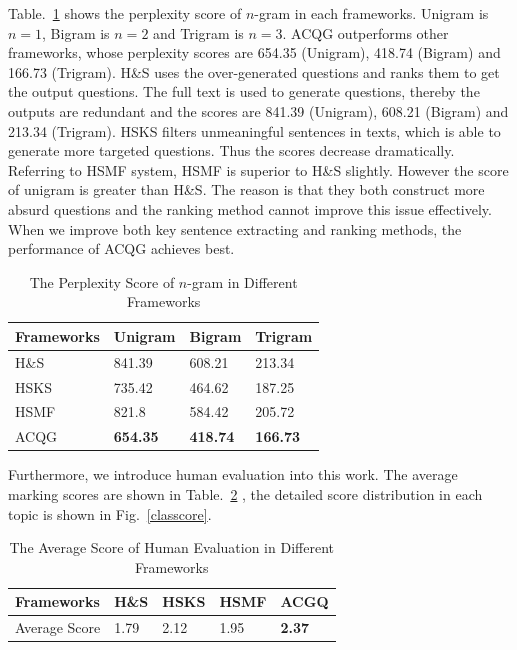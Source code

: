 \documentclass[runningheads,UTF8,article]{comsis2}
\begin{document}
	
	Table.~\ref{perplexity} shows the perplexity score of $ n $-gram in each frameworks. Unigram is $n=1$, Bigram is $ n=2$ and Trigram is $n=3$. ACQG outperforms other frameworks, whose perplexity scores are 654.35 (Unigram), 418.74 (Bigram) and 166.73 (Trigram). H\&S uses the over-generated questions and ranks them to get the output questions. The full text is used to generate questions, thereby the outputs are redundant and the scores are 841.39 (Unigram), 608.21 (Bigram) and 213.34 (Trigram). HSKS filters unmeaningful sentences in texts, which is able to generate more targeted questions. Thus the scores decrease dramatically. Referring to HSMF system, HSMF is superior to H\&S slightly. However the score of unigram is greater than H\&S. The reason is that they both construct more absurd questions and the ranking method cannot improve this issue effectively. When we improve both key sentence extracting and ranking methods, the performance of ACQG achieves best.
	\begin{table}[!ht]
		\centering
		\caption{The Perplexity Score of $n$-gram in Different Frameworks}
		\label{perplexity}
		\setlength\tabcolsep{0.5em}
		\begin{tabular}{|p{50pt}|p{50pt}p{50pt}p{50pt}|}
			\hline
			Frameworks& Unigram & Bigram & Trigram \\
			\hline
			H\&S & 841.39 & 608.21 & 213.34\\
			HSKS & 735.42 & 464.62 & 187.25 \\
			HSMF& 821.8 & 584.42 & 205.72 \\
			ACQG & \textbf{654.35} & \textbf{418.74} & \textbf{166.73} \\
			\hline
		\end{tabular}
	\end{table}
	
	
	Furthermore, we introduce human evaluation into this work. The average marking scores are shown in Table.~\ref{averagescre} , the detailed score distribution in each topic is shown in Fig.~\ref{classcore}. 
	
	
	\begin{table}[!ht]
		\centering
		\caption{The Average Score of Human Evaluation in Different Frameworks}
		\label{averagescre}
		\setlength\tabcolsep{0.5em}
		\begin{tabular}{|p{80pt}|p{40pt}p{40pt}p{40pt}p{40pt}|}
			\hline
			Frameworks  & H\&S & HSKS & HSMF & ACGQ \\
			\hline
			Average Score & 1.79 & 2.12 & 1.95 &\textbf{2.37}\\
			\hline
		\end{tabular}
	\end{table}
	
\end{document}
